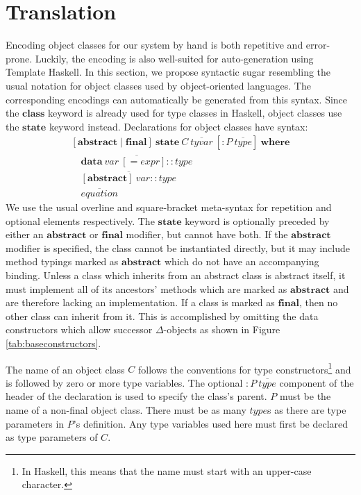 \section{Translation}
\label{sec:auto}

Encoding object classes for our system by hand is both repetitive and error-prone. Luckily, the encoding is also well-suited for auto-generation using Template Haskell.
In this section, we propose syntactic sugar resembling the usual notation for object classes used by object-oriented languages. The corresponding encodings can automatically be generated from this syntax. Since the $\mathbf{class}$ keyword is already used for type classes in Haskell, object classes use the $\mathbf{state}$ keyword instead.
Declarations for object classes have syntax:
\begin{displaymath}
\begin{array}{l}
[\mathbf{abstract} \mid \mathbf{final}]~\mathbf{state}~\mathit{C}~\overline{\mathit{tyvar}}~[: P~\overline{\mathit{type}}]~\mathbf{where} \\
\quad \overline{\mathbf{data}~\mathit{var}~[= \mathit{expr}] :: \mathit{type}} \\
\quad \overline{[\mathbf{abstract}]~\mathit{var} :: \mathit{type}} \\
\quad \overline{\mathit{equation}}
\end{array}
\end{displaymath}
We use the usual overline and square-bracket meta-syntax for repetition
and optional elements respectively.
The $\mathbf{state}$ keyword is optionally preceded by either an $\mathbf{abstract}$ or $\mathbf{final}$ modifier, but cannot have both. If the $\mathbf{abstract}$ modifier is specified, the class cannot be instantiated directly, but it may include method typings marked as $\mathbf{abstract}$ which do not have an accompanying binding. Unless a class which inherits from an abstract class is abstract itself, it must implement all of its ancestors' methods which are marked as $\mathbf{abstract}$ and are therefore lacking an implementation. If a class is marked as $\mathbf{final}$, then no other class can inherit from it. This is accomplished by omitting the data constructors which allow successor $\Delta$-objects as shown in Figure \ref{tab:baseconstructors}.

The name of an object class $C$ follows the conventions for type constructors\footnote{In Haskell, this means that the name must start with an upper-case character.} and is followed by zero or more type variables. The optional $: \mathit{P}~\overline{\mathit{type}}$ component of the header of the declaration is used to specify the class's parent. $P$ must be the name of a non-final object class. There must be as many $\mathit{type}$s as there are type parameters in $P$'s definition. Any type variables used here must first be declared as type parameters of $C$.

